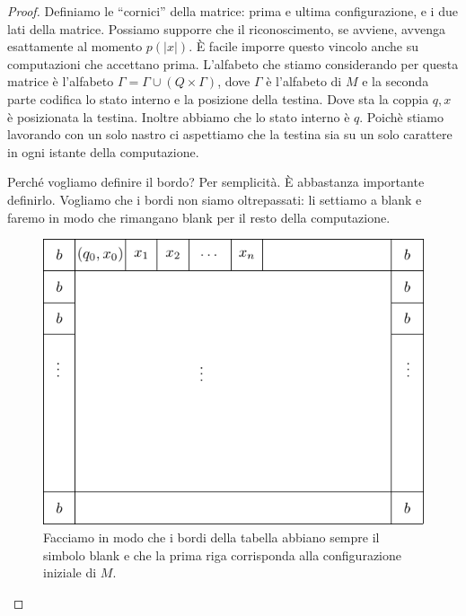 \begin{proof}
    Definiamo le ``cornici'' della matrice: prima e ultima configurazione, e i due lati della
    matrice. Possiamo supporre che il riconoscimento, se avviene, avvenga esattamente al momento
    $p(|x|)$. È facile imporre questo vincolo anche su computazioni che accettano prima. L'alfabeto
    che stiamo considerando per questa matrice è l'alfabeto $\Gamma = \Gamma \cup (Q \times
    \Gamma)$, dove $\Gamma$ è l'alfabeto di $M$ e la seconda parte codifica lo stato interno e la
    posizione della testina. Dove sta la coppia $q,x$ è posizionata la testina. Inoltre abbiamo che
    lo stato interno è $q$. Poichè stiamo lavorando con un solo nastro ci aspettiamo che la
    testina sia su un solo carattere in ogni istante della computazione.

    Perché vogliamo definire il bordo? Per semplicità. È abbastanza importante definirlo.
    Vogliamo che i bordi non siamo oltrepassati: li settiamo a blank e
    faremo in modo che rimangano blank per il resto della computazione.

    \begin{figure}[h]
        \begin{center}
            \includegraphics{./img/NPClass/SATproof2.pdf}
            \caption{Facciamo in modo che i bordi della tabella abbiano sempre il simbolo blank e
            che la prima riga corrisponda alla configurazione iniziale di $M$.}
        \end{center}
    \end{figure}



\end{proof}
